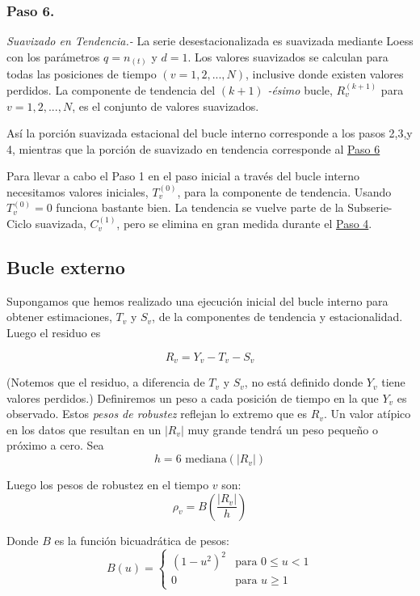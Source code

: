 \documentclass[12pt,oneside]{book}\usepackage[]{graphicx}\usepackage[]{color}
\theoremstyle{definition} %
\begin{document}
\subsubsection{Paso 6.} \textit{Suavizado en Tendencia.-}
\label{sbsec:paso6}
La serie desestacionalizada es suavizada mediante Loess con los parámetros $q=n_{(t)}$ y $d=1$. Los valores suavizados se calculan para todas las posiciones de tiempo $(v=1,2,...,N)$, inclusive donde existen valores perdidos. La componente de tendencia del $(k+1)$ \textit{-ésimo} bucle, $R_v^{(k+1)}$ para $v=1,2,...,N$, es el conjunto de valores suavizados. 


Así la porción suavizada estacional del bucle interno corresponde a los pasos 2,3,y 4, mientras que la porción de suavizado en tendencia corresponde al \hyperref[sbsec:paso6]{Paso 6}

Para llevar a cabo el Paso 1 en el paso inicial a través del bucle interno necesitamos valores iniciales, $T_v^{(0)}$, para la componente de tendencia. Usando $T_v^{(0)}=0$ funciona bastante bien. La tendencia se vuelve parte de la Subserie-Ciclo suavizada, $C_v^{(1)}$, pero se elimina en gran medida durante el 
\hyperref[sbsec:paso4]{Paso 4}.


\subsection{Bucle externo}
Supongamos que hemos realizado una ejecución inicial del bucle interno para obtener estimaciones, $T_v$ y $S_v$, de la componentes de tendencia y estacionalidad. Luego el residuo es

$$R_v = Y_v - T_v - S_v$$

(Notemos que el residuo, a diferencia de $T_v$ y $S_v$, no está definido donde $Y_v$ tiene valores perdidos.) 
Definiremos un peso a cada posición de tiempo en la que $Y_v$ es observado. Estos \textit{pesos de robustez} reflejan lo extremo que es $R_v$. Un valor atípico en los datos que resultan en un $|R_v|$ muy grande tendrá un peso pequeño o próximo a cero. Sea
$$h=6 \text{ mediana}(|R_v|)$$

Luego los pesos de robustez en el tiempo $v$ son:
$$\rho_v=B \left( \frac{|R_v|}{h}  \right)$$

Donde $B$ es la función bicuadrática de pesos:
\[
B(u)=
\left\{\begin{matrix}
(1-u^2)^2 & \text{para } 0\leq u < 1  \\ 
0 & \text{para } u\geq 1
\end{matrix}\right.
\] 
\end{document}
